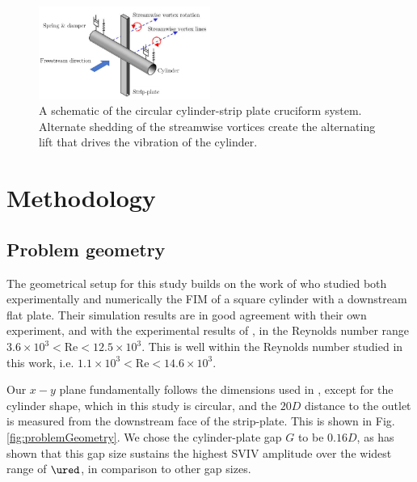 \documentclass[a4paper,fleqn]{cas-sc}
\begin{document}
\begin{figure}
  \centering
  \includegraphics[width=0.5\textwidth]{figs/figure1}
  \caption{A schematic of the circular cylinder-strip plate cruciform system. Alternate shedding of the streamwise vortices create the alternating lift that drives the vibration of the cylinder.}
  \label{fig:cruciformSystemSchematic}
\end{figure}

\section{Methodology} \label{sec:method}
\subsection{Problem geometry} \label{ssec:probGeo}
The geometrical setup for this study builds on the work of \citet{Maruai2017,Maruai2018} who studied both experimentally and numerically the FIM of a square cylinder with a downstream flat plate. Their simulation results are in good agreement with their own experiment, and with the experimental results of \citet{Kawabata2013}, in the Reynolds number range $3.6\times10^{3}<\text{Re}<12.5\times10^{3}$. This is well within the Reynolds number studied in this work, i.e. $1.1\times10^{3}<\text{Re}<14.6\times10^{3}$.

Our $x-y$ plane fundamentally follows the dimensions used in \citet{Maruai2017,Maruai2018}, except for the cylinder shape, which in this study is circular, and the $20D$ distance to the outlet is measured from the downstream face of the strip-plate. This is shown in Fig. \ref{fig:problemGeometry}. We chose the cylinder-plate gap $G$ to be $0.16D$, as \citet{Koide2013} has shown that this gap size sustains the highest SVIV amplitude over the widest range of $\ured$, in comparison to other gap sizes.
\end{document}

